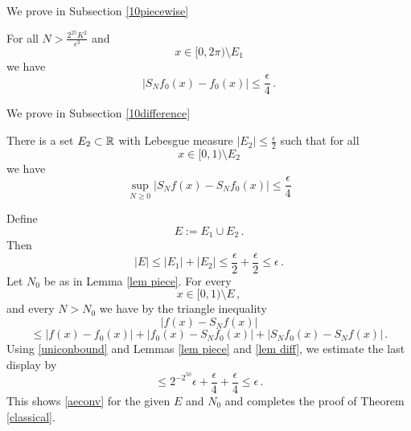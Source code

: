 We prove in Subsection \ref{10piecewise}
\begin{lemma}
\label{lem piece}
    For all $N>\frac {2^{25} K^2}{\epsilon ^3}$ and
    \begin{equation}
        x\in [0,2\pi)\setminus E_1
    \end{equation}
we have
    \begin{equation}
        |S_N f_0 (x)- f_0(x)|\le \frac \epsilon 4\, .
    \end{equation}
\end{lemma}

We prove in Subsection \ref{10difference}
\begin{lemma}\label{lem diff}
    There is a set $E_2 \subset \mathbb{R}$ with Lebesgue measure
    $|E_2|\le \frac \epsilon 2$ such that for all
    \begin{equation}
        x\in [0,1)\setminus E_2
    \end{equation}
    we have
    \begin{equation}
        \sup_{N\ge 0} |S_Nf(x)-S_Nf_0(x)|
        \le \frac \epsilon 4
    \end{equation}
\end{lemma}

Define
\begin{equation}
    E:=E_1\cup E_2\, .
\end{equation}
Then
\begin{equation}
    |E|\le |E_1|+|E_2|\le \frac \epsilon 2 +\frac \epsilon 2 \le \epsilon\, .
\end{equation}
Let $N_0$ be as in Lemma \ref{lem piece}.
For every
\begin{equation}
x\in [0,1)\setminus E\, ,
\end{equation}
and every $N>N_0$ we have by the triangle inequality
\begin{equation}
    |f(x)-S_Nf(x)|
    \end{equation}
    \begin{equation}
    \le |f(x)-f_0(x)|+ |f_0(x)-S_Nf_0(x)|+|S_Nf_0(x)-S_N f(x)|\, .
\end{equation}
Using \eqref{uniconbound} and Lemmas \ref{lem piece}
and \ref{lem diff}, we estimate the last display by
\begin{equation}
    \le 2^{-2^{50}} \epsilon +\frac \epsilon 4 +\frac \epsilon 4\le \epsilon\, .
\end{equation}
This shows  \eqref{aeconv} for the given $E$ and $N_0$
and completes the proof of Theorem \ref{classical}.

